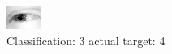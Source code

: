 \begin{figure}[h!]
\begin{center}
\includegraphics[width=0.60\columnwidth]{figures/ID2524_class_3_target_4.png}
\end{center}
\caption{ Classification: 3 actual target: 4}
\label{fig:ID2524_class_3_target_4}
\end{figure}
